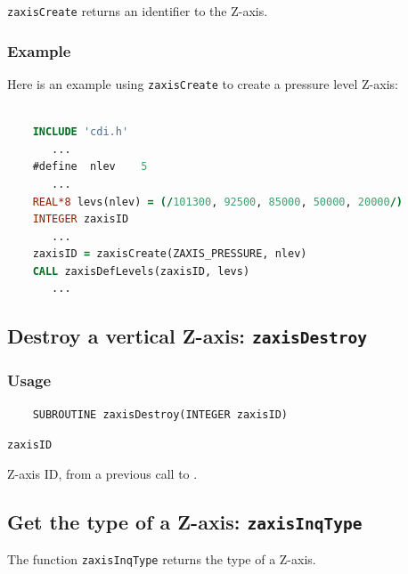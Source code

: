 {\texttt{zaxisCreate}} returns an identifier to the Z-axis.


\subsubsection*{Example}

Here is an example using {\texttt{zaxisCreate}} to create a pressure level Z-axis:

\begin{lstlisting}[language=Fortran, backgroundcolor=\color{pyellow}, basicstyle=\small, columns=flexible]

    INCLUDE 'cdi.h'
       ...
    #define  nlev    5
       ...
    REAL*8 levs(nlev) = (/101300, 92500, 85000, 50000, 20000/)
    INTEGER zaxisID
       ...
    zaxisID = zaxisCreate(ZAXIS_PRESSURE, nlev)
    CALL zaxisDefLevels(zaxisID, levs)
       ...
\end{lstlisting}


\subsection{Destroy a vertical Z-axis: \texttt{zaxisDestroy}}
\label{zaxisDestroy}
\subsubsection*{Usage}

\begin{verbatim}
    SUBROUTINE zaxisDestroy(INTEGER zaxisID)
\end{verbatim}

\hspace*{4mm}\begin{minipage}[]{15cm}
\begin{deflist}{\texttt{zaxisID}\ }
\item[\texttt{zaxisID}]
Z-axis ID, from a previous call to {}.

\end{deflist}
\end{minipage}


\subsection{Get the type of a Z-axis: \texttt{zaxisInqType}}
\label{zaxisInqType}

The function {\texttt{zaxisInqType}} returns the type of a Z-axis.

